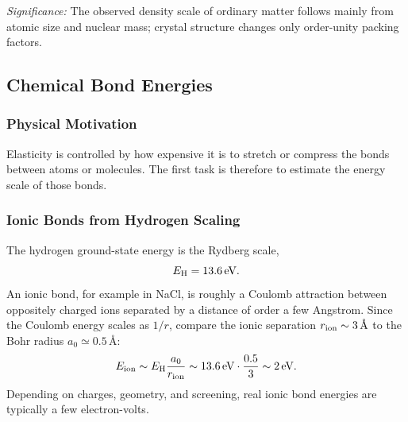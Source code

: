 
\textit{Significance:} The observed density scale of ordinary matter follows
mainly from atomic size and nuclear mass; crystal structure changes only
order-unity packing factors.


\subsection{Chemical Bond Energies}
\label{sec:lec11:bond-energies}

\subsubsection*{Physical Motivation}
Elasticity is controlled by how expensive it is to stretch or compress the
bonds between atoms or molecules. The first task is therefore to estimate the
energy scale of those bonds.

\subsubsection*{Ionic Bonds from Hydrogen Scaling}
The hydrogen ground-state energy is the Rydberg scale,
\begin{equation}
    E_{\rm H}=13.6\,\text{eV}.
    \label{eq:lec11:rydberg}
\end{equation}
An ionic bond, for example in NaCl, is roughly a Coulomb attraction between
oppositely charged ions separated by a distance of order a few Angstrom. Since
the Coulomb energy scales as $1/r$, compare the ionic separation
$r_{\rm ion}\sim3\,\text{\AA}$ to the Bohr radius $a_0\simeq0.5\,\text{\AA}$:
\begin{equation}
    E_{\rm ion}\sim E_{\rm H}\frac{a_0}{r_{\rm ion}}
    \sim 13.6\,\text{eV}\cdot\frac{0.5}{3}
    \sim 2\,\text{eV}.
    \label{eq:lec11:ionic-step}
\end{equation}
Depending on charges, geometry, and screening, real ionic bond energies are
typically a few electron-volts.

